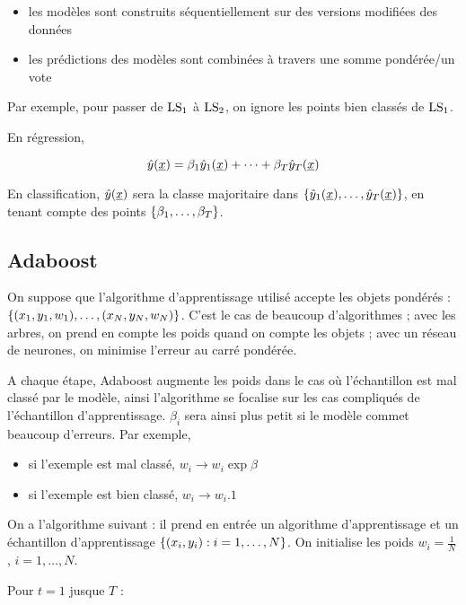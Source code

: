 \begin{itemize}
	\item les modèles sont construits séquentiellement sur des versions modifiées des données
	\item les prédictions des modèles sont combinées à travers une somme pondérée/un vote
\end{itemize}


Par exemple, pour passer de $\text{LS}_1$ à $\text{LS}_2$, on ignore les points bien classés de $\text{LS}_1$.

En régression,

$$\hat{y}(\underline{x}) = \beta_1\hat{y}_1(\underline{x}) + \dots + \beta_T \hat{y}_T(\underline{x})$$

En classification, $\hat{y}(\underline{x})$ sera la classe majoritaire dans $\lbrace \hat{y}_1(\underline{x}), \dots , \hat{y}_T(\underline{x}) \rbrace$, en tenant compte des points $\lbrace \beta_1, \dots , \beta_T \rbrace$.

	\subsection{Adaboost}
	
	On suppose que l'algorithme d'apprentissage utilisé accepte les objets pondérés : $\lbrace (x_1, y_1, w_1), \dots , (x_N, y_N, w_N) \rbrace$. C'est le cas de beaucoup d'algorithmes ; avec les arbres, on prend en compte les poids quand on compte les objets ; avec un réseau de neurones, on minimise l'erreur au carré pondérée.
	
	A chaque étape, Adaboost augmente les poids dans le cas où l'échantillon est mal classé par le modèle, ainsi l'algorithme se focalise sur les cas compliqués de l'échantillon d'apprentissage. $\beta_i$ sera ainsi plus petit si le modèle commet beaucoup d'erreurs. Par exemple,
	
	\begin{itemize}
		\item si l'exemple est mal classé, $w_i \rightarrow w_i \exp{\beta}$
		\item si l'exemple est bien classé, $w_i \rightarrow w_i . 1$
	\end{itemize}
	
	On a l'algorithme suivant : il prend en entrée un algorithme d'apprentissage et un échantillon d'apprentissage $\lbrace (x_i, y_i) : i = 1, \dots , N \rbrace$. On initialise les poids $w_i = \frac{1}{N}$, $i = 1 , \dots , N$.
	
	Pour $t = 1$ jusque $T$ :
	
